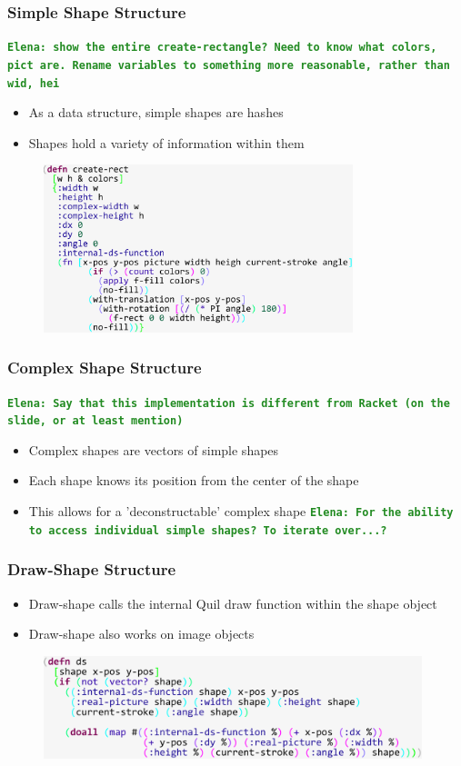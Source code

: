 \documentclass{beamer}
\newcommand{\comment}[1]{{\bf \tt  {#1}}}
\newcommand{\emcomment}[1]{\textcolor{ForestGreen}{\comment{Elena: {#1}}}}
\begin{document}
\begin{frame}
\frametitle{Simple Shape Structure}
\emcomment{show the entire create-rectangle? Need to know what colors, pict are. Rename variables to something more reasonable, rather than wid, hei}
	\begin{itemize}
		\item As a data structure, simple shapes are hashes
		\item Shapes hold a variety of information within them
	\end{itemize}
	\begin{figure}
		\includegraphics[width=9cm]{PresentationImages/rectHashmap.pdf}
	\end{figure}
\end{frame}

\begin{frame}
\frametitle{Complex Shape Structure}
\emcomment{Say that this implementation is different from Racket (on the slide, or at least mention)}
	\begin{itemize}
		\item Complex shapes are vectors of simple shapes
		\item Each shape knows its position from the center of the shape
		\item This allows for a 'deconstructable' complex shape \emcomment{For the ability to access individual simple shapes? To iterate over...?}
	\end{itemize}
\end{frame}

\begin{frame}
\frametitle{Draw-Shape Structure}
	\begin{itemize}
		\item Draw-shape calls the internal Quil draw function within the shape object
		\item Draw-shape also works on image objects
	\end{itemize}
	\begin{figure}
		\includegraphics[width=11cm]{PresentationImages/dsCode.pdf}
	\end{figure}
\end{frame}
\end{document}
